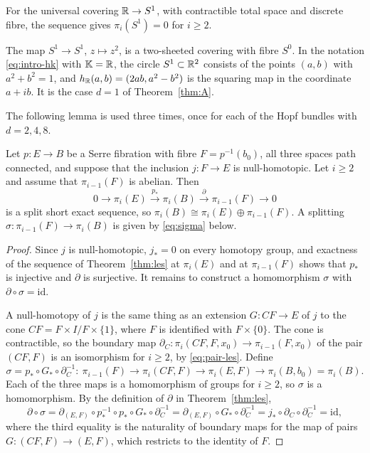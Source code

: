 \begin{example}\label{ex:covering}
For the universal covering $\mathbb{R}\to S^1$, with contractible total space and discrete fibre, the sequence gives $\pi_i(S^1)=0$ for $i\ge2$.
\end{example}

\begin{example}\label{ex:realhopf}
The map $S^1\to S^1$, $z\mapsto z^2$, is a two-sheeted covering with fibre $S^0$. In the notation \eqref{eq:intro-hk} with $\mathbb{K}=\mathbb{R}$, the circle $S^1\subset\mathbb{R}^2$ consists of the points $(a,b)$ with $a^2+b^2=1$, and $h_{\mathbb{R}}(a,b)=(2ab,a^2-b^2)$ is the squaring map in the coordinate $a+ib$. It is the case $d=1$ of Theorem~\ref{thm:A}.
\end{example}

The following lemma is used three times, once for each of the Hopf bundles with $d=2,4,8$.

\begin{lemma}[Splitting]\label{lem:split}
Let $p\colon E\to B$ be a Serre fibration with fibre $F=p^{-1}(b_0)$, all three spaces path connected, and suppose that the inclusion $j\colon F\to E$ is null-homotopic. Let $i\ge2$ and assume that $\pi_{i-1}(F)$ is abelian. Then
\[
0\to\pi_i(E)\xrightarrow{\ p_*\ }\pi_i(B)\xrightarrow{\ \partial\ }\pi_{i-1}(F)\to0
\]
is a split short exact sequence, so $\pi_i(B)\cong\pi_i(E)\oplus\pi_{i-1}(F)$. A splitting $\sigma\colon\pi_{i-1}(F)\to\pi_i(B)$ is given by \eqref{eq:sigma} below.
\end{lemma}

\begin{proof}
Since $j$ is null-homotopic, $j_*=0$ on every homotopy group, and exactness of the sequence of Theorem~\ref{thm:les} at $\pi_i(E)$ and at $\pi_{i-1}(F)$ shows that $p_*$ is injective and $\partial$ is surjective. It remains to construct a homomorphism $\sigma$ with $\partial\circ\sigma=\mathrm{id}$.

A null-homotopy of $j$ is the same thing as an extension $G\colon CF\to E$ of $j$ to the cone $CF=F\times I/F\times\{1\}$, where $F$ is identified with $F\times\{0\}$. The cone is contractible, so the boundary map $\partial_C\colon\pi_i(CF,F,x_0)\to\pi_{i-1}(F,x_0)$ of the pair $(CF,F)$ is an isomorphism for $i\ge2$, by \eqref{eq:pair-les}. Define
\begin{equation}\label{eq:sigma}
\sigma=p_*\circ G_*\circ\partial_C^{-1}\colon\ \pi_{i-1}(F)\to\pi_i(CF,F)\to\pi_i(E,F)\to\pi_i(B,b_0)=\pi_i(B).
\end{equation}
Each of the three maps is a homomorphism of groups for $i\ge2$, so $\sigma$ is a homomorphism. By the definition of $\partial$ in Theorem~\ref{thm:les},
\[
\partial\circ\sigma=\partial_{(E,F)}\circ p_*^{-1}\circ p_*\circ G_*\circ\partial_C^{-1}=\partial_{(E,F)}\circ G_*\circ\partial_C^{-1}=j_*\circ\partial_C\circ\partial_C^{-1}=\mathrm{id},
\]
where the third equality is the naturality of boundary maps for the map of pairs $G\colon(CF,F)\to(E,F)$, which restricts to the identity of $F$.
\end{proof}

